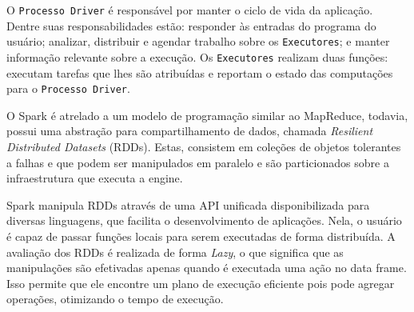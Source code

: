 O \texttt{Processo Driver} é responsável por manter o ciclo de vida da 
aplicação. Dentre suas responsabilidades estão: responder às entradas do 
programa do usuário; analizar, distribuir e agendar trabalho sobre os 
\texttt{Executores}; e manter informação relevante sobre a execução. Os 
\texttt{Executores} realizam duas funções: executam tarefas que lhes são 
atribuídas e reportam o estado das computações para o \texttt{Processo 
Driver}.

O Spark é atrelado a um modelo de programação similar ao MapReduce, todavia, 
possui uma abstração para compartilhamento de dados, chamada \emph{Resilient 
Distributed Datasets} (RDDs). Estas, consistem em coleções de objetos tolerantes 
a falhas e que podem ser manipulados em paralelo e são particionados sobre a 
infraestrutura que executa a engine. 

Spark manipula RDDs através de uma API unificada disponibilizada para diversas 
linguagens, que facilita o desenvolvimento de aplicações. Nela, o usuário é 
capaz de passar funções locais para serem executadas de forma distribuída. A 
avaliação dos RDDs é realizada de forma \emph{Lazy}, o que significa que as 
manipulações são efetivadas apenas quando é executada uma ação no data frame. 
Isso permite que ele encontre um plano de execução eficiente pois pode agregar 
operações, otimizando o tempo de execução.





